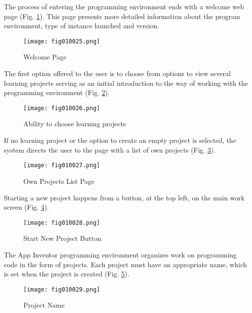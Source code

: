 The process of entering the programming environment ends with a welcome web page (Fig. \ref{fig010025}). This page presents more detailed information about the program environment, type of instance launched and version.

\begin{figure}[H]
   \centering
   \texttt{[image: fig010025.png]}
   \caption{Welcome Page}
\label{fig010025}
\end{figure}

The first option offered to the user is to choose from options to view several learning projects serving as an initial introduction to the way of working with the programming environment (Fig. \ref{fig010026}).

\begin{figure}[H]
   \centering
   \texttt{[image: fig010026.png]}
   \caption{Ability to choose learning projects}
\label{fig010026}
\end{figure}

If no learning project or the option to create an empty project is selected, the system directs the user to the page with a list of own projects (Fig. \ref{fig010027}).

\begin{figure}[H]
   \centering
   \texttt{[image: fig010027.png]}
   \caption{Own Projects List Page}
\label{fig010027}
\end{figure}

Starting a new project happens from a button, at the top left, on the main work screen (Fig. \ref{fig010028}).

\begin{figure}[H]
   \centering
   \texttt{[image: fig010028.png]}
   \caption{Start New Project Button}
\label{fig010028}
\end{figure}

The App Inventor programming environment organizes work on programming code in the form of projects. Each project must have an appropriate name, which is set when the project is created (Fig. \ref{fig010029}).

\begin{figure}[H]
   \centering
   \texttt{[image: fig010029.png]}
   \caption{Project Name}
\label{fig010029}
\end{figure}


